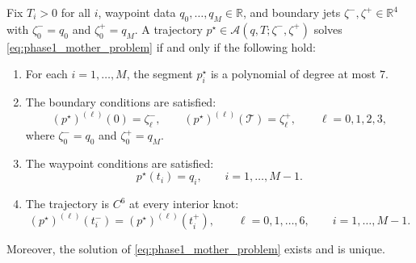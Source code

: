 \begin{theorem}
  \label{thm:phase1_minco_theorem}
  Fix $T_i>0$ for all $i$, waypoint data $q_0,\dots,q_M\in\mathbb R$, and boundary jets
  $\zeta^-,\zeta^+\in\mathbb R^4$ with $\zeta^-_0=q_0$ and $\zeta^+_0=q_M$.
  A trajectory $p^\star\in\mathcal A(q,T;\zeta^-,\zeta^+)$ solves
  \eqref{eq:phase1_mother_problem} if and only if the following hold:

  \begin{enumerate}
    \item For each $i=1,\dots,M$, the segment $p_i^\star$ is a polynomial of degree at most $7$.

    \item The boundary conditions are satisfied:
      \[
        (p^\star)^{(\ell)}(0)=\zeta^-_\ell,
        \qquad
        (p^\star)^{(\ell)}(\mathcal T)=\zeta^+_\ell,
        \qquad \ell=0,1,2,3,
      \]
      where $\zeta^-_0=q_0$ and $\zeta^+_0=q_M$.

    \item The waypoint conditions are satisfied:
      \[
        p^\star(t_i)=q_i,\qquad i=1,\dots,M-1.
      \]

    \item The trajectory is $C^6$ at every interior knot:
      \[
        (p^\star)^{(\ell)}(t_i^-)
        =
        (p^\star)^{(\ell)}(t_i^+),
        \qquad
        \ell=0,1,\dots,6,
        \qquad
        i=1,\dots,M-1.
      \]
  \end{enumerate}

  Moreover, the solution of \eqref{eq:phase1_mother_problem} exists and is unique.
\end{theorem}


